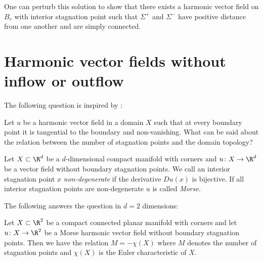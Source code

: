 \begin{frame}
  One can perturb this solution to show that there exists a harmonic vector field
  on $B_r$ with interior stagnation point such that $\Sigma^+$ and $\Sigma^-$ have positive distance
  from one another and are simply connected.
\end{frame}

\section{Harmonic vector fields without inflow or outflow}

\begin{frame}
  The following question is inspired by \cite{Lortz1970}:
  \begin{question}
    Let $u$ be a harmonic vector field in a domain $X$ such that at every boundary point it is tangential to the boundary
    and non-vanishing.
    What can be said about the relation between the number of stagnation points and the domain topology?
  \end{question}
\end{frame}

\begin{frame}
  \begin{definition}
    Let $X\subset\R^d$ be a $d$-dimensional compact manifold with corners and $u\colon X\to\R^d$ be a vector field without boundary stagnation points.
    We call an interior stagnation point $x$ \emph{non-degenerate} if the derivative $Du(x)$ is bijective.
    If all interior stagnation points are non-degenerate $u$ is called \emph{Morse}.
  \end{definition}
\end{frame}

\begin{frame}
  The following answers the question in $d=2$ dimensions:
  \begin{proposition}\label{pr:n2_hvf_noInflowNoOutflow}
    Let $X\subset\R^2$ be a compact connected planar manifold with corners
    and let $u\colon X\to\R^2$ be
    a Morse harmonic vector field without boundary stagnation points.
    Then we have the relation $M=-\chi(X)$ where $M$ denotes the number of stagnation points and
    $\chi(X)$ is the Euler characteristic of $X$.
  \end{proposition}
\end{frame}

